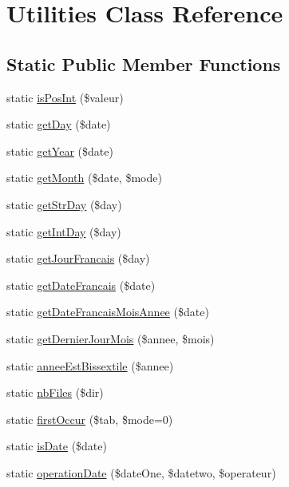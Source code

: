 \hypertarget{class_utilities}{}\section{Utilities Class Reference}
\label{class_utilities}
\subsection*{Static Public Member Functions}
\begin{DoxyCompactItemize}
\item 
static \hyperlink{class_utilities_af36aa51d20191f7718d33418001af3fb}{is\+Pos\+Int} (\$valeur)
\item 
static \hyperlink{class_utilities_a932a96b8eac601a1842e040c703657a5}{get\+Day} (\$date)
\item 
static \hyperlink{class_utilities_a7d6905a273f76e42d3ae5021248d2ed0}{get\+Year} (\$date)
\item 
static \hyperlink{class_utilities_ae2079f81b1e43b78deddc4bb77cb6c68}{get\+Month} (\$date, \$mode)
\item 
static \hyperlink{class_utilities_aed4a7fe88d85a1b64ebca49b5b8c8aa9}{get\+Str\+Day} (\$day)
\item 
static \hyperlink{class_utilities_a47fb2f7c80a9da546689e7ff188aa58b}{get\+Int\+Day} (\$day)
\item 
static \hyperlink{class_utilities_ab9b0bb93c5d3f205617398e33c1d1ea4}{get\+Jour\+Francais} (\$day)
\item 
static \hyperlink{class_utilities_aae99ab6f0743ff6fec92fb580916051e}{get\+Date\+Francais} (\$date)
\item 
static \hyperlink{class_utilities_a32a363b47bdf72b917ffd354dfcd2cb6}{get\+Date\+Francais\+Mois\+Annee} (\$date)
\item 
static \hyperlink{class_utilities_a9c7006be389743193fe09b92b5d57e3f}{get\+Dernier\+Jour\+Mois} (\$annee, \$mois)
\item 
static \hyperlink{class_utilities_ac554970f7f045a6373fc80aacfd3c11b}{annee\+Est\+Bissextile} (\$annee)
\item 
static \hyperlink{class_utilities_a34945d34c0465e88799eaeda066dfb53}{nb\+Files} (\$dir)
\item 
static \hyperlink{class_utilities_a3db97c6e1efe4c47efaf00d4e5f2163a}{first\+Occur} (\$tab, \$mode=0)
\item 
static \hyperlink{class_utilities_a4151d2b42a0b24dd9fdf6bc3823e6bda}{is\+Date} (\$date)
\item 
static \hyperlink{class_utilities_afdefc03981b517dfe3bf6c9f788b4c8d}{operation\+Date} (\$date\+One, \$datetwo, \$operateur)
\end{DoxyCompactItemize}


